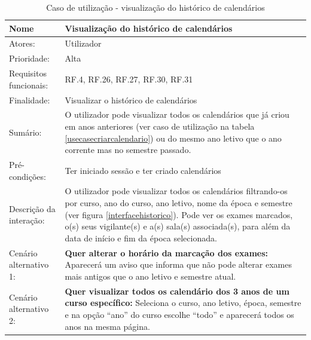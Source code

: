 \documentclass[11pt, twoside]{report}
\begin{document}
\def\arraystretch{1.5}
	\begin{table}[H]
	\caption{Caso de utilização - visualização do histórico de calendários}
	\begin{center}	
		\begin{tabularx}{\textwidth}{|l|X|}
			\hline
			\textbf{Nome }	& \textbf{Visualização do histórico de calendários} \\
			\hline
			Atores: & Utilizador \\
			\hline
			Prioridade: & Alta \\
			\hline
			Requisitos funcionais:&  RF.4, RF.26, RF.27, RF.30, RF.31\\
			\hline
			Finalidade: & Visualizar o histórico de calendários\\
			\hline
			Sumário: & O utilizador pode visualizar todos os calendários que já criou em anos anteriores (ver caso de utilização na tabela \ref{usecasecriarcalendario}) ou do mesmo ano letivo que o ano corrente mas no semestre passado. \\
			\hline
			Pré-condições: & Ter iniciado sessão e ter criado calendários\\
			\hline
			Descrição da interação: &  O utilizador pode visualizar todos os calendários filtrando-os por curso, ano do curso, ano letivo, nome da época e semestre (ver figura \ref{interfacehistorico}).
			Pode ver os exames marcados, o(s) seus vigilante(s) e a(s) sala(s) associada(s), para além da data de início e fim da época selecionada.\\
			\hline
			Cenário alternativo 1:& \textbf{Quer alterar o horário da marcação dos exames:} Aparecerá um aviso que informa que não pode alterar exames mais antigos que o ano letivo e semestre atual.\\
			\hline
			Cenário alternativo 2:& \textbf{Quer visualizar todos os calendário dos 3 anos de um curso específico:} Seleciona o curso, ano letivo, época, semestre e na opção ``ano'' do curso escolhe ``todo'' e aparecerá todos os anos na mesma página.\\
			\hline
		\end{tabularx}
	\end{center}
\end{table}
\end{document}
